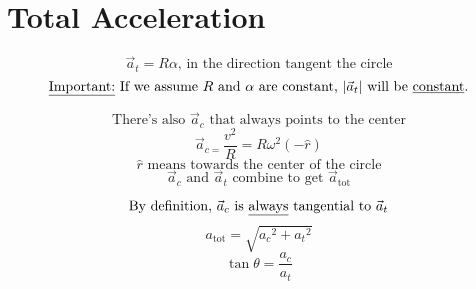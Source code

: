 \documentclass[fleqn]{article}
\begin{document}
\setlength{\mathindent}{0pt}
\section*{Total Acceleration}
\[ \vec{a} _{t} = R \alpha \text{, in the direction tangent the circle}  \]
\[ \text{\underline{Important:} If we assume } R \text{ and } \alpha \text{ are constant, } |\vec{a}_{t}| \text{ will be \underline{constant}.}       \]

\[ \text{There's also } \vec{a} _{c} \text{ that always points to the center}     \]
\[ \vec{a}_{c =} \frac{v^2}{R} = R \omega ^2 \left( - \hat{r} \right)   \]
\[ \hat{r} \text{ means towards the center of the circle}  \]
\[ \vec{a}_{c} \text{ and } \vec{a}_{t} \text{ combine to get } \vec{a}_{\text{tot} }         \]

\[ \text{By definition, } \vec{a}_{c} \text{ is \underline{always} tangential to } \vec{a} _{t}      \]
\[ a _{\text{tot} } = \sqrt{{a_c}^2 + {a_t}^2}  \]
\[ \tan \theta = \frac{a_c}{a_t}  \]
\end{document}
